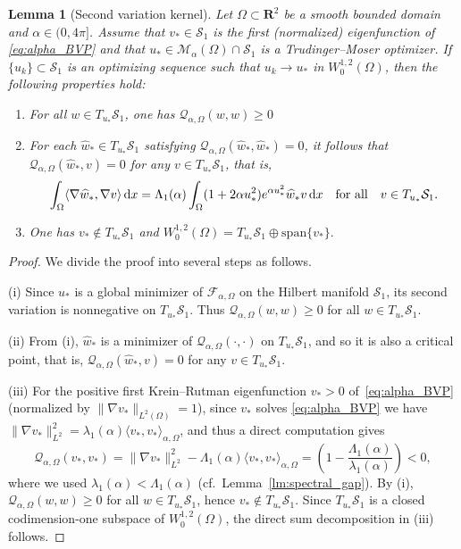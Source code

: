 \documentclass[reqno,11pt]{amsart}
\newtheorem{lemma}[theorem]{Lemma}
\theoremstyle{definition}
\newcommand{\ud}{\,\mathrm{d}}
\begin{document}
\begin{lemma}[Second variation kernel]\label{lem:Qalpha-kernel-extension}
Let $\Omega\subset\mathbf{R}^2$ be a smooth bounded domain and $\alpha\in(0,4\pi]$.
Assume that $v_*\in\mathcal{S}_1$ is the first (normalized) eigenfunction of
\eqref{eq:alpha_BVP} and that $u_*\in\mathcal{M}_\alpha(\Omega)\cap\mathcal{S}_1$
is a Trudinger--Moser optimizer.
If $\{u_k\}\subset\mathcal{S}_1$ is an optimizing sequence such that
$u_k\to u_*$ in $W^{1,2}_0(\Omega)$, then the following properties hold:
\begin{enumerate}[label=\textup{(\roman*)}]
\item For all $w\in T_{u_*}\mathcal{S}_1$, one has $\mathscr{Q}_{\alpha,\Omega}(w,w)\ge0$
\item For each $\widehat w_*
\in T_{u_*}\mathcal{S}_1$ satisfying
\(\mathscr{Q}_{\alpha,\Omega}(\widehat w_*,\widehat w_*)=0\), it follows that $\mathscr{Q}_{\alpha,\Omega}(\widehat w_*,v)=0$ for any $v\in T_{u_*}\mathcal{S}_1$, that is,
\begin{equation}\label{eq:EL-on-tangent}
\int_\Omega\langle \nabla\widehat w_*,\nabla v\rangle \ud x
=\Lambda_1(\alpha)\int_\Omega(1+2\alpha u_*^2)e^{\alpha u_*^2}
\widehat w_*v\ud x
\quad {\rm for \ all} \quad v\in T_{u_*}\mathcal{S}_1.
\end{equation}
\item One has $v_*\notin T_{u_*}\mathcal{S}_1$ and $W^{1,2}_0(\Omega)
=T_{u_*}\mathcal{S}_1\oplus\mathrm{span}\{v_*\}.$
\end{enumerate}
\end{lemma}

\begin{proof}
We divide the proof into several steps as follows.

\noindent\textrm{(i)}
Since $u_*$ is a global minimizer of $\mathscr{F}_{\alpha,\Omega}$ on the
Hilbert manifold $\mathcal{S}_1$, its second variation is nonnegative on
$T_{u_*}\mathcal{S}_1$.
Thus $\mathscr{Q}_{\alpha,\Omega}(w,w)\ge0$ for all
$w\in T_{u_*}\mathcal{S}_1$.

\noindent\textrm{(ii)}
From (i), $\widehat w_*$ is a minimizer of
$\mathscr{Q}_{\alpha,\Omega}(\cdot,\cdot)$ on $T_{u_*}\mathcal{S}_1$, and
so it is also a critical point, that is,
$\mathscr{Q}_{\alpha,\Omega}(\widehat w_*,v)=0$ for any $v\in T_{u_*}\mathcal{S}_1$.

\noindent\textrm{(iii)}
For the positive first Krein--Rutman eigenfunction $v_*>0$ of~\eqref{eq:alpha_BVP}
(normalized by $\|\nabla v_*\|_{L^2(\Omega)}=1$), since $v_*$ solves \eqref{eq:alpha_BVP} we have $\|\nabla v_*\|_{L^2}^2=\lambda_1(\alpha)\langle v_*,v_*\rangle_{\alpha,\Omega}$, and thus a direct computation gives
\[
\mathscr{Q}_{\alpha,\Omega}(v_*,v_*)
=\|\nabla v_*\|_{L^2}^2 - \Lambda_1(\alpha)\langle v_*,v_*\rangle_{\alpha,\Omega}
=\left(1-\frac{\Lambda_1(\alpha)}{\lambda_1(\alpha)}\right)<0,
\]
where we used $\lambda_1(\alpha)<\Lambda_1(\alpha)$ (cf.\ Lemma~\ref{lm:spectral_gap}).
By (i), $\mathscr{Q}_{\alpha,\Omega}(w,w)\ge0$ for all $w\in T_{u_*}\mathcal{S}_1$,
hence $v_*\notin T_{u_*}\mathcal{S}_1$.
Since $T_{u_*}\mathcal{S}_1$ is a closed codimension-one subspace of
$W^{1,2}_0(\Omega)$, the direct sum decomposition in (iii) follows.
\end{proof}
\end{document}
